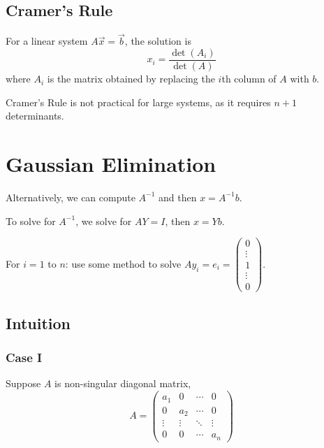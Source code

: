 \subsection{Cramer's Rule}

\begin{definition}
    For a linear system \( A \vec{x} = \vec{b} \), the solution is \[
        x_i = \frac{\det(A_i)}{\det(A)}
    \] where \( A_i \) is the matrix obtained by replacing the \( i \)th column of \( A \) with \( b \).
\end{definition}

\begin{remark}
    Cramer's Rule is not practical for large systems, as it requires \( n+1 \) determinants.
\end{remark}

\section{Gaussian Elimination}

Alternatively, we can compute \( A^{-1} \) and then \( x = A^{-1} b \).

To solve for \( A^{-1} \), we solve for \( AY = I \), then \( x = Yb \).

For \( i = 1 \) to \( n \):
use some method to solve \( Ay_i = e_i = \begin{pmatrix} 0 \\ \vdots \\ 1 \\ \vdots \\ 0 \end{pmatrix} \).

\subsection{Intuition}

\subsubsection{Case I}

Suppose \( A \) is non-singular diagonal matrix, \[
    A = \begin{pmatrix}
        a_1    & 0      & \cdots & 0      \\
        0      & a_2    & \cdots & 0      \\
        \vdots & \vdots & \ddots & \vdots \\
        0      & 0      & \cdots & a_n
    \end{pmatrix}
\]

